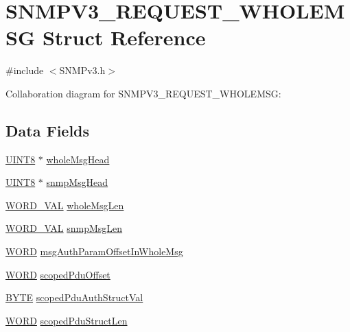 \hypertarget{struct_s_n_m_p_v3___r_e_q_u_e_s_t___w_h_o_l_e_m_s_g}{}\section{S\+N\+M\+P\+V3\+\_\+\+R\+E\+Q\+U\+E\+S\+T\+\_\+\+W\+H\+O\+L\+E\+M\+S\+G Struct Reference}
\label{struct_s_n_m_p_v3___r_e_q_u_e_s_t___w_h_o_l_e_m_s_g}


{\ttfamily \#include $<$S\+N\+M\+Pv3.\+h$>$}



Collaboration diagram for S\+N\+M\+P\+V3\+\_\+\+R\+E\+Q\+U\+E\+S\+T\+\_\+\+W\+H\+O\+L\+E\+M\+S\+G\+:
\subsection*{Data Fields}
\begin{DoxyCompactItemize}
\item 
\hyperlink{_generic_type_defs_8h_ab27e9918b538ce9d8ca692479b375b6a}{U\+I\+N\+T8} $\ast$ \hyperlink{struct_s_n_m_p_v3___r_e_q_u_e_s_t___w_h_o_l_e_m_s_g_af99ccdeb778a96ac8e3a805ecb3200da}{whole\+Msg\+Head}
\item 
\hyperlink{_generic_type_defs_8h_ab27e9918b538ce9d8ca692479b375b6a}{U\+I\+N\+T8} $\ast$ \hyperlink{struct_s_n_m_p_v3___r_e_q_u_e_s_t___w_h_o_l_e_m_s_g_a3b7aefd3517530a57e6ef17792ebb45a}{snmp\+Msg\+Head}
\item 
\hyperlink{union_w_o_r_d___v_a_l}{W\+O\+R\+D\+\_\+\+V\+A\+L} \hyperlink{struct_s_n_m_p_v3___r_e_q_u_e_s_t___w_h_o_l_e_m_s_g_ae16edc50bd430cdfe533ff1839bdc38c}{whole\+Msg\+Len}
\item 
\hyperlink{union_w_o_r_d___v_a_l}{W\+O\+R\+D\+\_\+\+V\+A\+L} \hyperlink{struct_s_n_m_p_v3___r_e_q_u_e_s_t___w_h_o_l_e_m_s_g_a2eb65a87fc853bbfaa74792f7367542c}{snmp\+Msg\+Len}
\item 
\hyperlink{_generic_type_defs_8h_a2b0e863dadf920709ec53d9088ee7c91}{W\+O\+R\+D} \hyperlink{struct_s_n_m_p_v3___r_e_q_u_e_s_t___w_h_o_l_e_m_s_g_ac55280eb448d59e069b56ce48901485d}{msg\+Auth\+Param\+Offset\+In\+Whole\+Msg}
\item 
\hyperlink{_generic_type_defs_8h_a2b0e863dadf920709ec53d9088ee7c91}{W\+O\+R\+D} \hyperlink{struct_s_n_m_p_v3___r_e_q_u_e_s_t___w_h_o_l_e_m_s_g_a5d5144db22a84ec38dafc6012c8a973b}{scoped\+Pdu\+Offset}
\item 
\hyperlink{_generic_type_defs_8h_a4ae1dab0fb4b072a66584546209e7d58}{B\+Y\+T\+E} \hyperlink{struct_s_n_m_p_v3___r_e_q_u_e_s_t___w_h_o_l_e_m_s_g_a155617bcb78c5060936d1ff06eb47298}{scoped\+Pdu\+Auth\+Struct\+Val}
\item 
\hyperlink{_generic_type_defs_8h_a2b0e863dadf920709ec53d9088ee7c91}{W\+O\+R\+D} \hyperlink{struct_s_n_m_p_v3___r_e_q_u_e_s_t___w_h_o_l_e_m_s_g_a718a8f5e74974ac4e424a0841e1cf4cd}{scoped\+Pdu\+Struct\+Len}
\end{DoxyCompactItemize}


